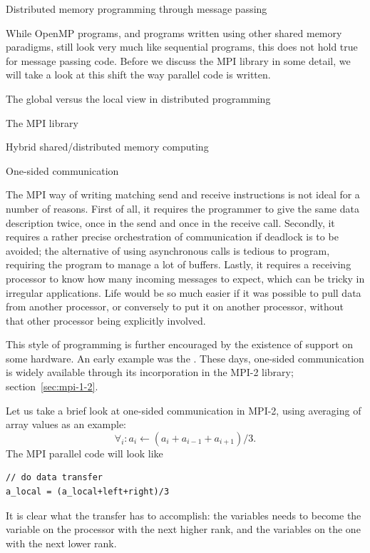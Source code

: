 
 {Distributed memory programming through message passing}

While OpenMP programs, and programs written using other shared memory
paradigms, still look very much like sequential programs, this does
not hold true for message passing code. Before we discuss the \acf{MPI}
library in some detail, we will take a look at this shift the way
parallel code is written.

 {The global versus the local view in distributed programming}
\label{sec:distributed-programming}

 {The MPI library}
\label{sec:mpi}


 {Hybrid shared/distributed memory computing}
\label{sec:hybrid}


 {One-sided communication}
\label{sec:one-sided}

The MPI way of writing matching send and receive instructions is not
ideal for a number of reasons. First of all, it requires the
programmer to give the same data description twice, once in the send
and once in the receive call. Secondly, it requires a rather precise
orchestration of communication if deadlock is to be avoided; the
alternative of using asynchronous calls is tedious to program,
requiring the program to manage a lot of buffers.
Lastly, it requires a receiving processor to know how many incoming
messages to expect, which can be tricky in irregular applications.
Life would be so much easier if it was
possible to pull data from another processor, or conversely to put it
on another processor, without that other processor being explicitly
involved. 

This style of programming is further encouraged by the
existence of  support on some hardware. An early example was
the  . 
These days, one-sided communication is widely available through its
incorporation in the MPI-2 library; section~\ref{sec:mpi-1-2}.

Let us take a brief look at one-sided communication in MPI-2, using
averaging of array values as an example:
\[ \forall_i\colon a_i\leftarrow (a_i+a_{i-1}+a_{i+1})/3. \]
The MPI parallel code will look like
\begin{verbatim}
// do data transfer
a_local = (a_local+left+right)/3
\end{verbatim}
It is clear what the transfer has to accomplish: the 
variables needs to become the  variable on the processor with
the next higher rank, and the  variables on the one with the
next lower rank.

